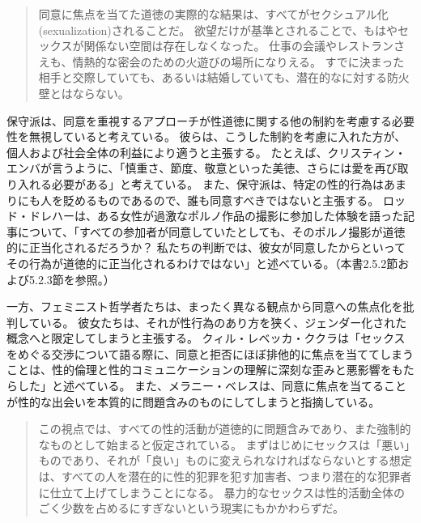 \documentclass[paper=a4,book,openany]{jlreq}
\newcommand{\ig}[1]{}           %
\begin{document}
\begin{quote}
同意に焦点を当てた道徳の実際的な結果は、すべてがセクシュアル化(sexualization)されることだ。
欲望だけが基準とされることで、もはやセックスが関係ない空間は存在しなくなった。
仕事の会議やレストランさえも、情熱的な密会のための火遊びの場所になりえる。
すでに決まった相手と交際していても、あるいは結婚していても、潜在的なに対する防火壁とはならない。
\citep{french17:_its_past_time}
\end{quote}

保守派は、同意を重視するアプローチが性道徳に関する他の制約を考慮する必要性を無視していると考えている。
彼らは、こうした制約を考慮に入れた方が、個人および社会全体の利益により適うと主張する。
たとえば、クリスティン・エンバが言うように、「慎重さ、節度、敬意といった美徳、さらには愛を再び取り入れる必要がある」と考えている\citep{emba17:_lets_rethin_sex}。
また、保守派は、特定の性的行為はあまりにも人を貶めるものであるので、誰も同意すべきではないと主張する。
ロッド・ドレハー\ig{Rod Dreher}は、ある女性が過激なポルノ作品の撮影に参加した体験を語った記事について、「すべての参加者が同意していたとしても、そのポルノ撮影が道徳的に正当化されるだろうか？ 私たちの判断では、彼女が同意したからといってその行為が道徳的に正当化されるわけではない」と述べている\citep{dreher13:_porn_cultur_consen}。（本書2.5.2節および5.2.3節を参照。）

一方、フェミニスト哲学者たちは、まったく異なる観点から同意への焦点化を批判している。
彼女たちは、それが性行為のあり方を狭く、ジェンダー化された概念へと限定してしまうと主張する。
クィル・レベッカ・ククラは「セックスをめぐる交渉について語る際に、同意と拒否にほぼ排他的に焦点を当ててしまうことは、性的倫理と性的コミュニケーションの理解に深刻な歪みと悪影響をもたらした」と述べている\citep[p.75]{kukla18:_thats_what_she_said}。
また、メラニー・ベレスは、同意に焦点を当てることが性的な出会いを本質的に問題含みのものにしてしまうと指摘している。

\begin{quote}
この視点では、すべての性的活動が道徳的に問題含みであり、また強制的なものとして始まると仮定されている。
まずはじめにセックスは「悪い」ものであり、それが「良い」ものに変えられなければならないとする想定は、すべての人を潜在的に性的犯罪を犯す加害者、つまり潜在的な犯罪者に仕立て上げてしまうことになる。
暴力的なセックスは性的活動全体のごく少数を占めるにすぎないという現実にもかかわらずだ。
\citep[p.102]{beres07:_spont_sexual_consen}
\end{quote}
\end{document}
